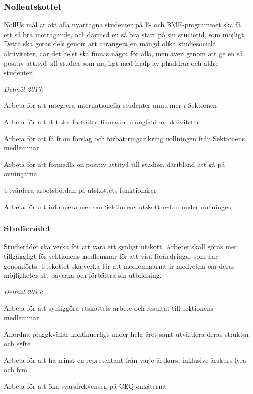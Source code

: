 \documentclass[10pt]{article}
\begin{document}
\newpage

\subsubsection*{Nolleutskottet}
NollUs mål är att alla nyantagna studenter på E- och BME-programmet ska få ett så bra mottagande, och därmed en så bra start på sin studietid, som möjligt. Detta ska göras dels genom att arrangera en mängd olika studiesociala aktiviteter, där det helst ska finnas något för alla, men även genom att ge en så positiv attityd till studier som möjligt med hjälp av phaddrar och äldre studenter.

\emph{Delmål 2017:}
\begin{dashlist}
    \item Arbeta för att integrera internationella studenter ännu mer i Sektionen
    \item Arbeta för att det ska fortsätta finnas en mångfald av aktiviteter
    \item Arbeta för att få fram förslag och förbättringar kring nollningen från Sektionens medlemmar
    \item Arbeta för att förmedla en positiv attityd till studier, däribland att gå på övningarna
    \item Utvärdera arbetsbördan på utskottets funktionärer
    \item Arbeta för att informera mer om Sektionens utskott redan under nollningen
\end{dashlist}

\subsubsection*{Studierådet}
Studierådet ska verka för att vara ett synligt utskott. Arbetet skall göras mer tillgängligt för sektionens medlemmar för att visa förändringar som har genomförts. Utskottet ska verka för att medlemmarna är medvetna om deras möjligheter att påverka och förbättra sin utbildning.

\emph{Delmål 2017:}
\begin{dashlist}
    \item Arbeta för att synliggöra utskottets arbete och resultat till sektionens medlemmar
    \item Anordna pluggkvällar kontinuerligt under hela året samt utvärdera deras struktur och syfte
    \item Arbeta för att ha minst en representant från varje årskurs, inklusive årskurs fyra och fem
    \item Arbeta för att öka svarsfrekvensen på CEQ-enkäterna
\end{dashlist}
\end{document}
